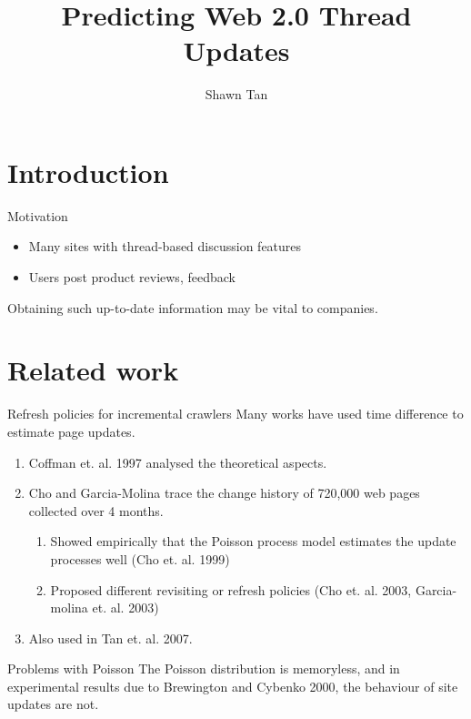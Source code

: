 \documentclass[12pt]{../presentation}
\title{Predicting Web 2.0 Thread Updates}
\author{Shawn Tan}
\date{}
\begin{document}
\maketitle
\section{Introduction}
\begin{frame}{Motivation}
	\begin{itemize}
		\item Many sites with thread-based discussion features
		\item Users post product reviews, feedback
	\end{itemize}
	Obtaining such up-to-date information may be vital to companies.
\end{frame}

\section{Related work}
\begin{frame}{Refresh policies for incremental crawlers}
Many works have used time difference to estimate page updates.
	\begin{enumerate}
		\item Coffman et. al. 1997 analysed the theoretical aspects.
		\item Cho and Garcia-Molina trace the change history of 720,000 web pages collected over 4 months.
		\begin{enumerate}		
			\item Showed empirically that the Poisson process model estimates the update processes well (Cho et. al. 1999)
			\item Proposed different revisiting or refresh policies (Cho et. al. 2003, Garcia-molina et. al. 2003)
		\end{enumerate}
		\item Also used in Tan et. al. 2007. %
	\end{enumerate}
\end{frame}

\begin{frame}{Problems with Poisson}
	The Poisson distribution is memoryless, and in experimental results due to Brewington and Cybenko 2000, the behaviour of site updates are not. 
\end{frame}
\end{document}
